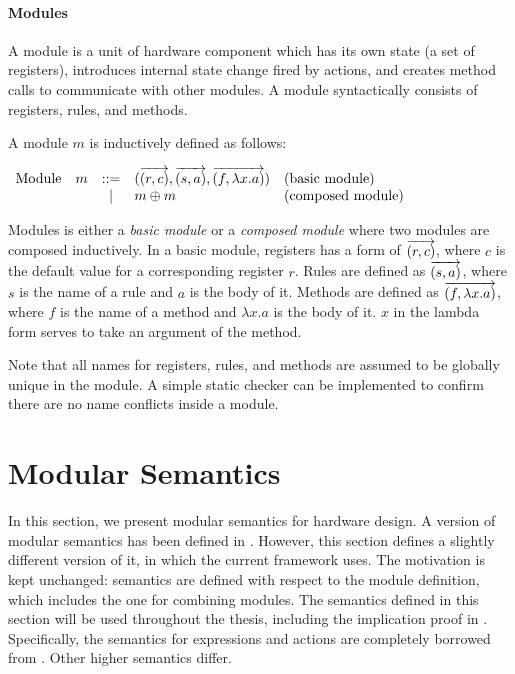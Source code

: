 \paragraph{Modules}
A module is a unit of hardware component which has its own state (a
set of registers), introduces internal state change fired by actions,
and creates method calls to communicate with other modules. A module
syntactically consists of registers, rules, and methods.

\begin{definition}
  \label{def-module}
  A module $m$ is inductively defined as follows:
  \begin{center}
    \begin{math}
      \begin{array}{rcll}
        \textrm{Module}\quad m & ::=
        & (\overrightarrow{(r, c)}, \overrightarrow{(s, a)}, \overrightarrow{(f, \lambda x.a)})
        & \textrm{(basic module)} \\
        & | & m \oplus m & \textrm{(composed module)}
      \end{array}
    \end{math}
  \end{center}
\end{definition}

Modules is either a \emph{basic module} or a \emph{composed module}
where two modules are composed inductively. In a basic module,
registers has a form of $\overrightarrow{(r, c)}$, where $c$ is the
default value for a corresponding register $r$. Rules are defined as
$\overrightarrow{(s, a)}$, where $s$ is the name of a rule and $a$ is
the body of it. Methods are defined as $\overrightarrow{(f, \lambda
    x.a)}$, where $f$ is the name of a method and $\lambda x.a$ is the
body of it. $x$ in the lambda form serves to take an argument of the
method.

Note that all names for registers, rules, and methods are assumed to
be globally unique in the module. A simple static checker can be
implemented to confirm there are no name conflicts inside a module.

\section{Modular Semantics}
\label{sec-semmod}

In this section, we present modular semantics for hardware design. A
version of modular semantics has been defined in \cite{murali-thesis}.
However, this section defines a slightly different version of it, in
which the current \Kami{} framework uses. The motivation is kept
unchanged: semantics are defined with respect to the module
definition, which includes the one for combining modules. The
semantics defined in this section will be used throughout the thesis,
including the implication proof in .
Specifically, the semantics for expressions and actions are completely
borrowed from \cite{murali-thesis}. Other higher semantics differ.

